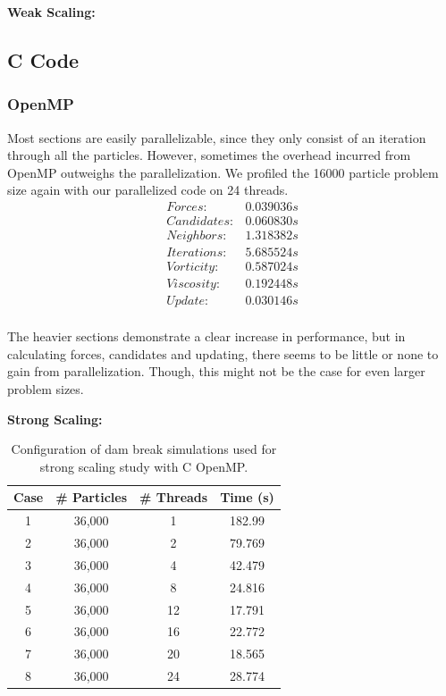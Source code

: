 \documentclass{scrartcl}
\begin{document}
  \textbf{Weak Scaling:}
  
    \subsection{C Code}  
    \subsubsection{OpenMP}
    
    Most sections are easily parallelizable, since they only consist of an iteration through all the particles. However, sometimes the overhead incurred from OpenMP outweighs the parallelization. We profiled the 16000 particle problem size again with our parallelized code on 24 threads.
    \[\begin{array}{lc}
    Forces:     & 0.039036 s \\
    Candidates: & 0.060830 s \\
    Neighbors:  & 1.318382 s \\
    Iterations: & 5.685524 s \\
    Vorticity:  & 0.587024 s \\
    Viscosity:  & 0.192448 s \\
    Update:     & 0.030146 s \\
    \end{array}\]
    
    The heavier sections demonstrate a clear increase in performance, but in calculating forces, candidates and updating, there seems to be little or none to gain from parallelization. Though, this might not be the case for even larger problem sizes.
    
    \textbf{Strong Scaling:}
    \begin{table}
    	\begin{center}
    		\begin{tabular}{| c | c | c | c |}
    			\hline
    			Case & \# Particles & \# Threads & Time (s) \\ \hline		  		
    			1 & 36,000 &  1 & 182.99 \\ \hline		  		
    			2 & 36,000 &  2 & 79.769 \\ \hline		  		
    			3 & 36,000 &  4 & 42.479 \\ \hline		  		
    			4 & 36,000 &  8 & 24.816 \\ \hline		  		
    			5 & 36,000 & 12 & 17.791 \\ \hline		  		
    			6 & 36,000 & 16 & 22.772 \\ \hline		  		
    			7 & 36,000 & 20 & 18.565 \\ \hline		  		
    			8 & 36,000 & 24 & 28.774 \\ \hline		  		
    		\end{tabular}
    		\caption{Configuration of dam break simulations used for strong scaling study with C OpenMP.}
    		\label{tab:css}
    	\end{center}
    \end{table}
    
\end{document}

